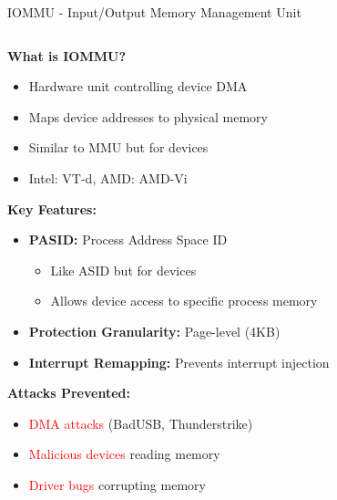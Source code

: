 \documentclass[aspectratio=169,12pt]{beamer}
\begin{document}
\begin{frame}{IOMMU - Input/Output Memory Management Unit}
    \begin{columns}
        \begin{column}{0.5\textwidth}
            \textbf{What is IOMMU?}
            \begin{itemize}
                \item Hardware unit controlling device DMA
                \item Maps device addresses to physical memory
                \item Similar to MMU but for devices
                \item Intel: VT-d, AMD: AMD-Vi
            \end{itemize}
            
            \vspace{0.3cm}
            \textbf{Key Features:}
            \begin{itemize}
                \item \textbf{PASID:} Process Address Space ID
                \begin{itemize}
                    \item Like ASID but for devices
                    \item Allows device access to specific process memory
                \end{itemize}
                \item \textbf{Protection Granularity:} Page-level (4KB)
                \item \textbf{Interrupt Remapping:} Prevents interrupt injection
            \end{itemize}
            
            \vspace{0.3cm}
            \textbf{Attacks Prevented:}
            \begin{itemize}
                \item \textcolor{red}{DMA attacks} (BadUSB, Thunderstrike)
                \item \textcolor{red}{Malicious devices} reading memory
                \item \textcolor{red}{Driver bugs} corrupting memory
            \end{itemize}
        \end{column}
        \begin{column}{0.5\textwidth}
\end{column}
\end{columns}
\end{frame}
\end{document}
